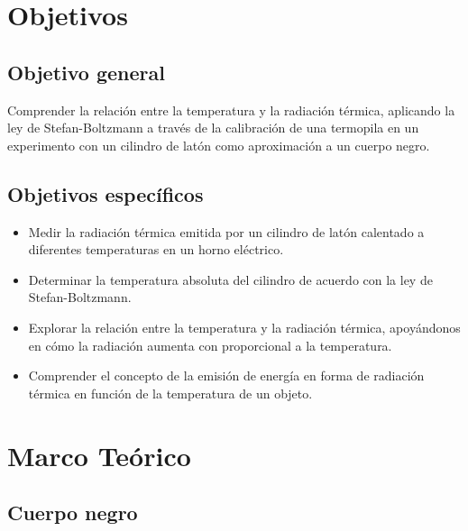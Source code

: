 \documentclass[letterpaper, 12pt]{article}
\begin{document}
\section{Objetivos}

\subsection{Objetivo general}

Comprender la relación entre la temperatura y la radiación
térmica, aplicando la ley de Stefan-Boltzmann a través de
la calibración de una termopila en un experimento con un
cilindro de latón como aproximación a un cuerpo negro.

\subsection{Objetivos específicos}

\begin{itemize}[label=$\triangleright$]
      \item Medir la radiación térmica emitida por un cilindro de latón
            calentado a diferentes temperaturas en un horno eléctrico.

      \item Determinar la temperatura absoluta del cilindro de acuerdo
            con la ley de Stefan-Boltzmann.

      \item Explorar la relación entre la temperatura y la radiación
            térmica, apoyándonos en cómo la radiación aumenta con
            proporcional a la temperatura.

      \item Comprender el concepto de la emisión de energía en forma de
            radiación térmica en función de la temperatura de un
            objeto.
\end{itemize}

\section{Marco Teórico}

\subsection{Cuerpo negro~\cite{Elcuerponegro}}
\end{document}
